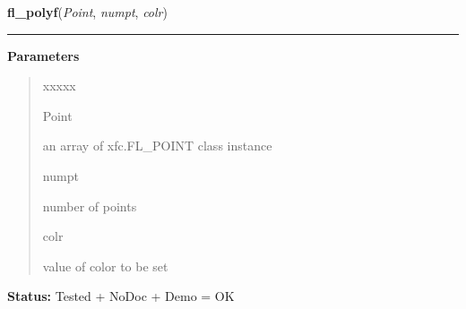 \hspace{.8\funcindent}\begin{boxedminipage}{\funcwidth}

    \raggedright \textbf{fl\_polyf}(\textit{Point}, \textit{numpt}, \textit{colr})

    \vspace{-1.5ex}

    \rule{\textwidth}{0.5\fboxrule}
\setlength{\parskip}{2ex}
\setlength{\parskip}{1ex}
      \textbf{Parameters}
      \vspace{-1ex}

      \begin{quote}
        \begin{Ventry}{xxxxx}

          \item[Point]

          an array of xfc.FL\_POINT class instance

          \item[numpt]

          number of points

          \item[colr]

          value of color to be set

        \end{Ventry}

      \end{quote}

\textbf{Status:} Tested + NoDoc + Demo = OK



    \end{boxedminipage}

    \label{xformslib:library:fl_polyl}

    \vspace{0.5ex}

